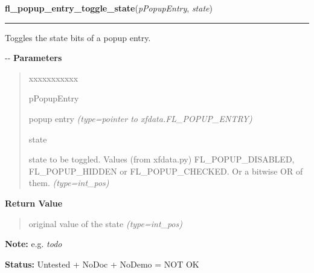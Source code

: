     \vspace{0.5ex}

\hspace{.8\funcindent}\begin{boxedminipage}{\funcwidth}

    \raggedright \textbf{fl\_popup\_entry\_toggle\_state}(\textit{pPopupEntry}, \textit{state})

    \vspace{-1.5ex}

    \rule{\textwidth}{0.5\fboxrule}
\setlength{\parskip}{2ex}

Toggles the state bits of a popup entry.

-{}-
\setlength{\parskip}{1ex}
      \textbf{Parameters}
      \vspace{-1ex}

      \begin{quote}
        \begin{Ventry}{xxxxxxxxxxx}

          \item[pPopupEntry]


popup entry
            {\it (type=pointer to xfdata.FL\_POPUP\_ENTRY)}

          \item[state]


state to be toggled. Values (from xfdata.py) FL\_POPUP\_DISABLED,
FL\_POPUP\_HIDDEN or FL\_POPUP\_CHECKED. Or a bitwise OR of them.
            {\it (type=int\_pos)}

        \end{Ventry}

      \end{quote}

      \textbf{Return Value}
    \vspace{-1ex}

      \begin{quote}

original value of the state
      {\it (type=int\_pos)}

      \end{quote}

\textbf{Note:} 
e.g. \emph{todo}


\textbf{Status:} 
Untested + NoDoc + NoDemo = NOT OK


    \end{boxedminipage}

    \label{xformslib:flpopup:fl_popup_entry_set_text}

